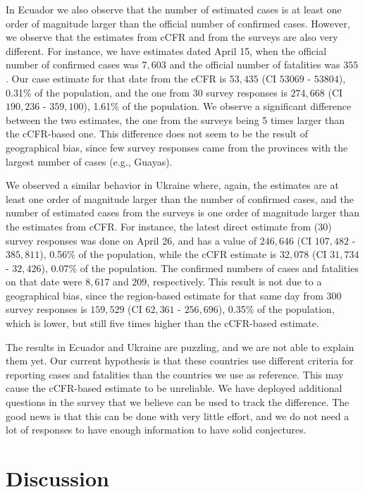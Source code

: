 \documentclass{article}
\begin{document}
In Ecuador we also observe that the number of estimated cases is at least one order of magnitude larger than the official number of confirmed cases. However, we observe that the estimates from cCFR and from the surveys are also very different. For instance, we have estimates dated April 15, when the official number of confirmed cases was $7,603$ and the official number of fatalities was $355$. Our case estimate for that date from the cCFR is $53,435$ (CI $53069$ - $53804$), 0.31\% of the population, and the one from 30 survey responses is $274,668$ (CI $190,236$ - $359,100$), 1.61\% of the population. We observe a significant difference between the two estimates, the one from the surveys being 5 times larger than the cCFR-based one. This difference does not seem to be the result of geographical bias, since few survey responses came from the provinces with the largest number of cases (e.g., Guayas).

We observed a similar behavior in Ukraine where, again, the estimates are at least one order of magnitude larger than the number of confirmed cases, and the number of estimated cases from the surveys is one order of magnitude larger than the estimates from cCFR. For instance,
the latest direct estimate from (30) survey responses was done on April 26, and has a value of $246,646$ (CI $107,482$ - $385,811$), 0.56\% of the population, while the cCFR estimate is $32,078$ (CI $31,734$ - $32,426$), 0.07\% of the population. The confirmed numbers of cases and fatalities on that date were $8,617$ and $209$, respectively. This result is not due to a geographical bias, since the region-based estimate for that same day from 300 survey responses is $159,529$ (CI $62,361$ - $256,696$), 0.35\% of the population, which is lower, but still five times higher than the cCFR-based estimate.

The results in Ecuador and Ukraine are puzzling, and we are not able to explain them yet. Our current hypothesis is that these countries use different criteria for reporting cases and fatalities than the countries we use as reference. This may cause the cCFR-based estimate to be unreliable. We have deployed additional questions in the survey that we believe can be used to track the difference. The good news is that this can be done with very little effort, and we do not need a lot of responses to have enough information to have solid conjectures.

\section{Discussion}
\end{document}
